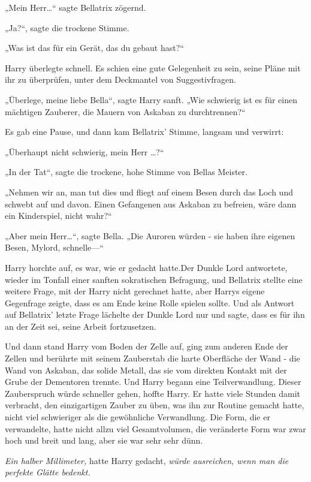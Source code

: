 {„Mein Herr…“ sagte Bellatrix zögernd.

„Ja?“, sagte die trockene Stimme.

„Was ist das für ein Gerät, das du gebaut hast?“

Harry überlegte schnell. Es schien eine gute Gelegenheit zu sein, seine Pläne mit ihr zu überprüfen, unter dem Deckmantel von Suggestivfragen.

„Überlege, meine liebe Bella“, sagte Harry sanft. „Wie schwierig ist es für einen mächtigen Zauberer, die Mauern von Askaban zu durchtrennen?“

Es gab eine Pause, und dann kam Bellatrix' Stimme, langsam und verwirrt:

„Überhaupt nicht schwierig, mein Herr …?“

„In der Tat“, sagte die trockene, hohe Stimme von Bellas Meister.

„Nehmen wir an, man tut dies und fliegt auf einem Besen durch das Loch und schwebt auf und davon. Einen Gefangenen aus Askaban zu befreien, wäre dann ein Kinderspiel, nicht wahr?“

„Aber mein Herr…“, sagte Bella. „Die Auroren würden - sie haben ihre eigenen Besen, Mylord, schnelle—“

Harry horchte auf, es war, wie er gedacht hatte.Der Dunkle Lord antwortete, wieder im Tonfall einer sanften sokratischen Befragung, und Bellatrix stellte eine weitere Frage, mit der Harry nicht gerechnet hatte, aber Harrys eigene Gegenfrage zeigte, dass es am Ende keine Rolle spielen sollte. Und als Antwort auf Bellatrix' letzte Frage lächelte der Dunkle Lord nur und sagte, dass es für ihn an der Zeit sei, seine Arbeit fortzusetzen.

Und dann stand Harry vom Boden der Zelle auf, ging zum anderen Ende der Zellen und berührte mit seinem Zauberstab die harte Oberfläche der Wand - die Wand von Askaban, das solide Metall, das sie vom direkten Kontakt mit der Grube der Dementoren trennte. Und Harry begann eine Teilverwandlung. Dieser Zauberspruch würde schneller gehen, hoffte Harry. Er hatte viele Stunden damit verbracht, den einzigartigen Zauber zu üben, was ihn zur Routine gemacht hatte, nicht viel schwieriger als die gewöhnliche Verwandlung. Die Form, die er verwandelte, hatte nicht allzu viel Gesamtvolumen, die veränderte Form war zwar hoch und breit und lang, aber sie war sehr sehr dünn.

\emph{Ein halber Millimeter,} hatte Harry gedacht, \emph{würde ausreichen, wenn man die perfekte Glätte bedenkt.}

}
